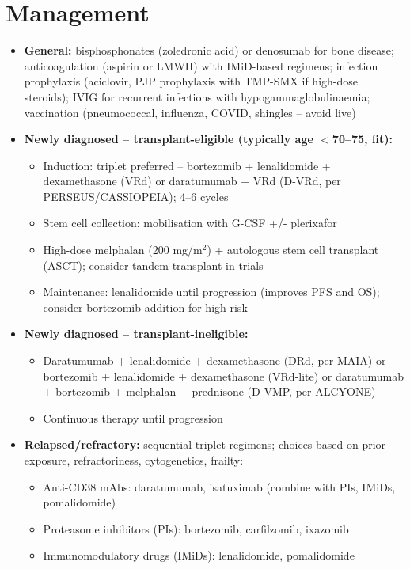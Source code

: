 \section*{Management}
\begin{itemize}
    \item \textbf{General:} bisphosphonates (zoledronic acid) or denosumab for bone disease; anticoagulation (aspirin or LMWH) with IMiD-based regimens; infection prophylaxis (aciclovir, PJP prophylaxis with TMP-SMX if high-dose steroids); IVIG for recurrent infections with hypogammaglobulinaemia; vaccination (pneumococcal, influenza, COVID, shingles -- avoid live)
    \item \textbf{Newly diagnosed -- transplant-eligible (typically age $<$70--75, fit):}
    \begin{itemize}
        \item Induction: triplet preferred -- bortezomib + lenalidomide + dexamethasone (VRd) or daratumumab + VRd (D-VRd, per PERSEUS/CASSIOPEIA); 4--6 cycles
        \item Stem cell collection: mobilisation with G-CSF +/- plerixafor
        \item High-dose melphalan (200 mg/m$^2$) + autologous stem cell transplant (ASCT); consider tandem transplant in trials
        \item Maintenance: lenalidomide until progression (improves PFS and OS); consider bortezomib addition for high-risk
    \end{itemize}
    \item \textbf{Newly diagnosed -- transplant-ineligible:}
    \begin{itemize}
        \item Daratumumab + lenalidomide + dexamethasone (DRd, per MAIA) or bortezomib + lenalidomide + dexamethasone (VRd-lite) or daratumumab + bortezomib + melphalan + prednisone (D-VMP, per ALCYONE)
        \item Continuous therapy until progression
    \end{itemize}
    \item \textbf{Relapsed/refractory:} sequential triplet regimens; choices based on prior exposure, refractoriness, cytogenetics, frailty:
    \begin{itemize}
        \item Anti-CD38 mAbs: daratumumab, isatuximab (combine with PIs, IMiDs, pomalidomide)
        \item Proteasome inhibitors (PIs): bortezomib, carfilzomib, ixazomib
        \item Immunomodulatory drugs (IMiDs): lenalidomide, pomalidomide

\end{itemize}
\end{itemize}
